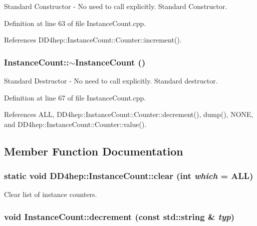 Standard Constructor -\/ No need to call explicitly. Standard Constructor. 

Definition at line 63 of file InstanceCount.cpp.

References DD4hep::InstanceCount::Counter::increment().\hypertarget{struct_d_d4hep_1_1_instance_count_a7d9ff65ecca8d6024f7275ea93058ad7}{
\subsubsection[{$\sim$InstanceCount}]{\setlength{\rightskip}{0pt plus 5cm}InstanceCount::$\sim$InstanceCount ()}}
\label{struct_d_d4hep_1_1_instance_count_a7d9ff65ecca8d6024f7275ea93058ad7}


Standard Destructor -\/ No need to call explicitly. Standard destructor. 

Definition at line 67 of file InstanceCount.cpp.

References ALL, DD4hep::InstanceCount::Counter::decrement(), dump(), NONE, and DD4hep::InstanceCount::Counter::value().

\subsection{Member Function Documentation}
\hypertarget{struct_d_d4hep_1_1_instance_count_a94bb311b134800236d5be147df616072}{
\subsubsection[{clear}]{\setlength{\rightskip}{0pt plus 5cm}static void DD4hep::InstanceCount::clear (int {\em which} = {\ttfamily ALL})}}
\label{struct_d_d4hep_1_1_instance_count_a94bb311b134800236d5be147df616072}


Clear list of instance counters. \hypertarget{struct_d_d4hep_1_1_instance_count_a5c0cdd835f58abbd7f1d54069b5f04b2}{
\subsubsection[{decrement}]{\setlength{\rightskip}{0pt plus 5cm}void InstanceCount::decrement (const std::string \& {\em typ})}}
\label{struct_d_d4hep_1_1_instance_count_a5c0cdd835f58abbd7f1d54069b5f04b2}



